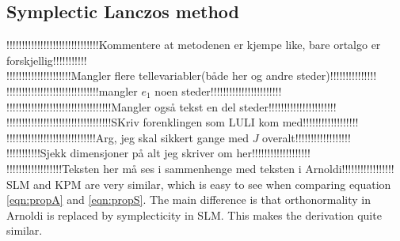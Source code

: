 \subsection{Symplectic Lanczos method}
!!!!!!!!!!!!!!!!!!!!!!!!!!!!!!Kommentere at metodenen er kjempe like, bare ortalgo er forskjellig!!!!!!!!!!!\\
!!!!!!!!!!!!!!!!!!!!!Mangler flere tellevariabler(både her og andre steder)!!!!!!!!!!!!!!!\\
!!!!!!!!!!!!!!!!!!!!!!!!!!!!!!mangler $e_1$ noen steder!!!!!!!!!!!!!!!!!!!!!!!\\
!!!!!!!!!!!!!!!!!!!!!!!!!!!!!!!!!!Mangler også tekst en del steder!!!!!!!!!!!!!!!!!!!!!!\\
!!!!!!!!!!!!!!!!!!!!!!!!!!!!!!!!!!SKriv forenklingen som LULI kom med!!!!!!!!!!!!!!!!!!\\
!!!!!!!!!!!!!!!!!!!!!!!!!!!!!Arg, jeg skal sikkert gange med $J$ overalt!!!!!!!!!!!!!!!!!!\\
!!!!!!!!!!!Sjekk dimensjoner på alt jeg skriver om her!!!!!!!!!!!!!!!!!!!\\
!!!!!!!!!!!!!!!!!!Teksten her må ses i sammenhenge med teksten i Arnoldi!!!!!!!!!!!!!!!!!\\
SLM and KPM are very similar, which is easy to see when comparing equation \eqref{eqn:propA} and \eqref{eqn:propS}. The main difference is that orthonormality in Arnoldi is replaced by symplecticity in SLM. This makes the derivation quite similar.\\

